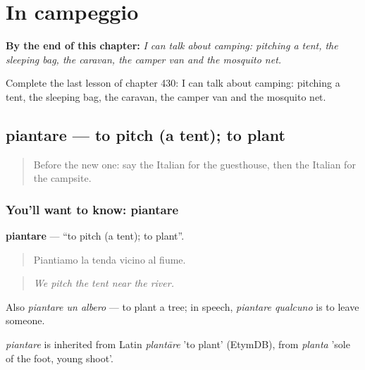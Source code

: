 
\chapter{In campeggio}
\label{ch:it-in-campeggio}

\begin{chapteropening}
\textbf{By the end of this chapter:} \emph{I can talk about camping: pitching a tent, the sleeping bag, the caravan, the camper van and the mosquito net.}

Complete the last lesson of chapter 430: I can talk about camping: pitching a tent, the sleeping bag, the caravan, the camper van and the mosquito net.
\end{chapteropening}

\section[piantare]{piantare — to pitch (a tent); to plant}

\label{lesson:IT-C430-piantare}



\begin{quote}
Before the new one: say the Italian for the guesthouse, then the Italian for the campsite.
\end{quote}

\subsection*{You'll want to know: piantare}
\textbf{piantare} — \textquotedblleft{}to pitch (a tent); to plant\textquotedblright{}.

\begin{quote}
Piantiamo la tenda vicino al fiume.
\end{quote}

\begin{quote}
\emph{We pitch the tent near the river.}
\end{quote}

Also \emph{piantare un albero} — to plant a tree; in speech, \emph{piantare qualcuno} is to leave someone.

\begin{cousinweb}
\emph{piantare} is inherited from Latin \emph{plantāre} 'to plant' (EtymDB), from \emph{planta} 'sole of the foot, young shoot'.
\end{cousinweb}

